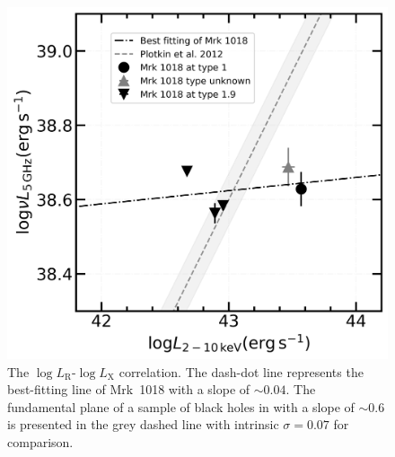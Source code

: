 \begin{figure}
\centering
	\includegraphics[width=\linewidth]{./pic/Mrk1018_radio_xray_Plotkin2012_Lx_near.png}
    \caption{The $\log L_\mathrm{R}$-$\log L_\mathrm{X}$ correlation. The dash-dot line represents the best-fitting line of Mrk~1018 with a slope of $\sim 0.04$. %
    The fundamental plane of a sample of black holes in \citet{2012MNRAS.419..267P} with a slope of $\sim 0.6$ is presented in the grey dashed line with intrinsic $\sigma=0.07$ for comparison.} 
    \label{fig:radio-xray-mass_relation_Plotkin2012}
\end{figure}